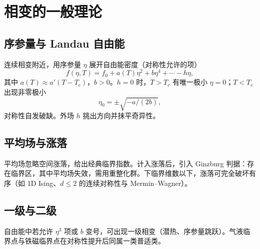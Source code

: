 \section{相变的一般理论}

\subsection{序参量与 Landau 自由能}

连续相变附近，用序参量 $\eta$ 展开自由能密度（对称性允许的项）
\begin{equation}
  f(\eta,T)
  =f_0
  +a(T)\eta^2
  +b\eta^4
  +\cdots
  -h\eta,
\end{equation}
其中 $a(T)\approx a'(T-T_c)$，$b>0$。$h=0$ 时，$T>T_c$ 有唯一极小 $\eta=0$；$T<T_c$ 出现非零极小
\begin{equation}
  \eta_0=\pm\sqrt{-a/(2b)},
\end{equation}
对称性自发破缺。外场 $h$ 挑出方向并抹平奇异性。

\subsection{平均场与涨落}

平均场忽略空间涨落，给出经典临界指数。计入涨落后，引入 Ginzburg 判据：存在临界区，其中平均场失效，需用重整化群。下临界维数以下，涨落可完全破坏有序（如 1D Ising、$d\le2$ 的连续对称性与 Mermin--Wagner）。

\subsection{一级与二级}

自由能中若允许 $\eta^3$ 项或 $b$ 变号，可出现一级相变（潜热、序参量跳跃）。气液临界点与铁磁临界点在对称性提升后同属一类普适类。
